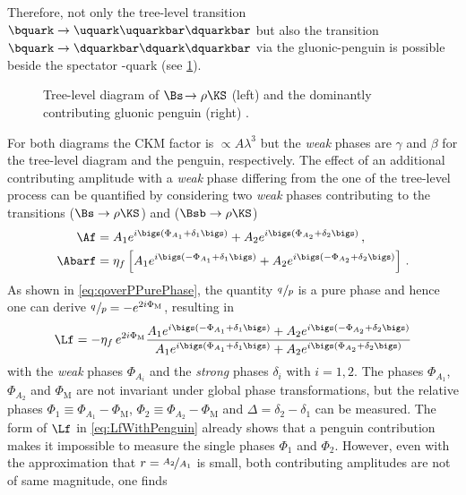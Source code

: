 Therefore, not only the tree-level transition $\bquark\to\uquark\uquarkbar\dquarkbar$ but also the transition $\bquark\to\dquarkbar\dquark\dquarkbar$ via  the gluonic-penguin is possible beside the spectator \squark-quark (see \cref{fig:Bs2RhoKS}).
\begin{figure}[tbp]
	\centering
	
	
	\caption{Tree-level diagram of $\Bs\!\to\rho\KS$ (left) and the dominantly contributing gluonic penguin (right) \cite{Ellis:2016jkw}.}
	\label{fig:Bs2RhoKS}
\end{figure}
For both diagrams the CKM factor is $\propto\!A\lambda^3$ but the \emph{weak} phases are $\gamma$ and $\beta$ for the tree-level diagram and the penguin, respectively.
The effect of an additional contributing amplitude with a \emph{weak} phase differing from the one of the tree-level process can be quantified by considering two \emph{weak} phases contributing to the transitions \Af ($\Bs\to\rho\KS$) and \Abarf ($\Bsb\to\rho\KS$)
\begin{equation}
\begin{aligned}
\Af&=A_1e^{i\bigs(\Phi_{A_1}+\delta_1\bigs)}+A_2e^{i\bigs(\Phi_{A_2}+\delta_2\bigs)}\,,\\
\Abarf&=\eta_f\left[A_1e^{i\bigs(-\Phi_{A_1}+\delta_1\bigs)}+A_2e^{i\bigs(-\Phi_{A_2}+\delta_2\bigs)}\right]\,.
\end{aligned}
\end{equation}
As shown in \cref{eq:qoverPPurePhase}, the quantity $\nicefrac{q\,}{p}$ is a pure phase and hence one can derive \mbox{$\nicefrac{q\,}{p}=-e^{2i\Phi_\text{M}}$}, resulting in
\begin{equation}
\Lf=-\eta_f\,e^{2i\Phi_\text{M}}\frac{ A_1 e^{i\bigs(-\Phi_{A_1}+\delta_1\bigs)} + A_2 e^{i\bigs(-\Phi_{A_2}+\delta_2\bigs)}}{A_1e^{i\bigs(\Phi_{A_1}+\delta_1\bigs)}+A_2e^{i\bigs(\Phi_{A_2}+\delta_2\bigs)}} \label{eq:LfWithPenguin}
\end{equation}
with the \emph{weak} phases $\Phi_{A_i}$ and the \emph{strong} phases $\delta_i$ with $i=1,2$.
The phases $\Phi_{A_1}$, $\Phi_{A_2}$ and $\Phi_\text{M}$ are not invariant under global phase transformations, but the relative phases \mbox{$\Phi_1\equiv\Phi_{A_1}-\Phi_\text{M}$}, \mbox{$\Phi_2\equiv\Phi_{A_2}-\Phi_\text{M}$} and $\Delta=\delta_2-\delta_1$ can be measured.
The form of $\Lf$ in \cref{eq:LfWithPenguin} already shows that a penguin contribution makes it impossible to measure the single phases $\Phi_1$ and $\Phi_2$.
However, even with the approximation that $r=\nicefrac{A_2}{A_1}$ is small, \ie both contributing amplitudes are not of same magnitude, one finds
